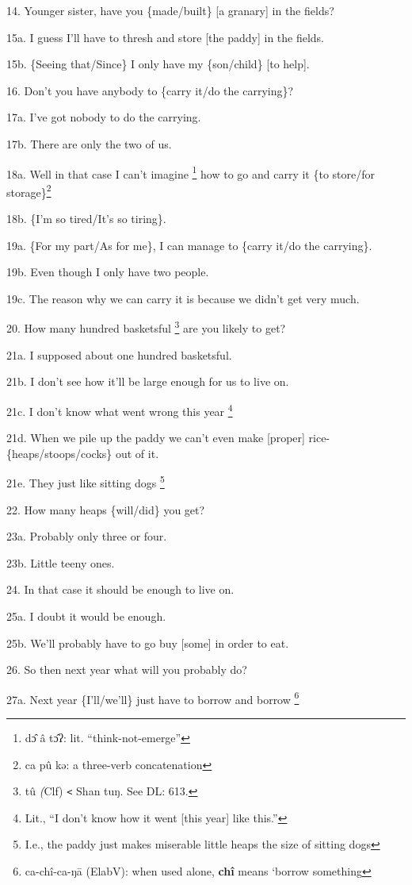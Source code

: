 14. Younger sister, have you \{made/built\} [a granary] in the fields?

15a. I guess I'll have to thresh and store [the paddy] in the fields.

15b. \{Seeing that/Since\} I only have my \{son/child\} [to help].

16. Don't you have anybody to \{carry it/do the carrying\}?

17a. I've got nobody to do the carrying.

17b. There are only the two of us.

18a. Well in that case I can't imagine \footnote{dɔ̂ â tɔ̂ʔ: lit. ``think-not-emerge''} how to go and carry it \{to store/for
storage\}\.\footnote{ca  pû  kə: a three-verb concatenation}

18b. \{I'm so tired/It's so tiring\}.

19a. \{For my part/As for me\}, I can manage to \{carry it/do the carrying\}.

19b. Even though I only have two people.

19c. The reason why we can carry it is because we didn't get very much.

20. How many hundred basketsful \footnote{tû \emph{(}Clf) \texttt{<} Shan tuŋ. See DL: 613.} are you likely to get?

21a. I supposed about one hundred basketsful.

21b. I don't see how it'll be large enough for us to live on.

21c. I don't know what went wrong this year \.\footnote{Lit., ``I don't know how it went [this year] like this.''}

21d. When we pile up the paddy we can't even make [proper] rice-\{heaps/stoops/cocks\}
out of it.

21e. They just like sitting dogs \.\footnote{I.e., the paddy just makes miserable little heaps the size of sitting dogs}

22. How many heaps \{will/did\} you get?

23a. Probably only three or four.

23b. Little teeny ones.

24. In that case it should be enough to live on.

25a. I doubt it would be enough.

25b. We'll probably have to go buy [some] in order to eat.

26. So then next year what will you probably do?

27a. Next year \{I'll/we'll\} just have to borrow and borrow \.\footnote{ca-chî-ca-ŋā (ElabV): when used alone, \textbf{chî} means `borrow something}

